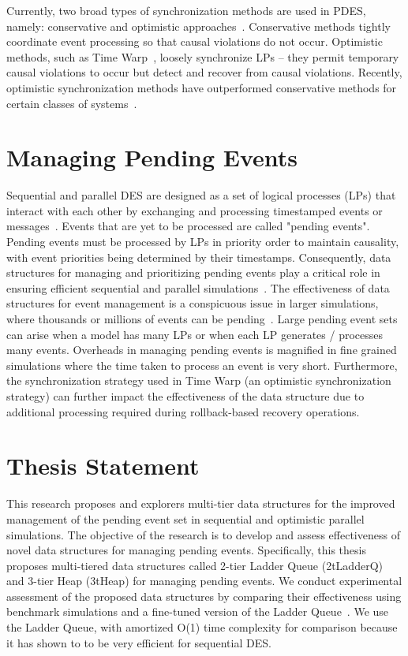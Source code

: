 Currently, two broad types of synchronization methods are used in
PDES, namely: conservative and optimistic approaches~\cite{jafer-13}.
Conservative methods tightly coordinate event processing so that
causal violations do not occur.  Optimistic methods, such as Time
Warp~\cite{jafer-13}, loosely synchronize LPs -- they permit temporary
causal violations to occur but detect and recover from causal
violations.  Recently, optimistic synchronization methods have outperformed conservative methods for certain classes of
systems~\cite{jafer-13}.


\section{Managing Pending Events}

Sequential and parallel DES are designed as a set of logical processes
(LPs) that interact with each other by exchanging and processing
timestamped events or messages~\cite{jafer-13}. Events that are yet to
be processed are called "pending events". Pending events must be
processed by LPs in priority order to maintain causality, with event
priorities being determined by their timestamps. Consequently, data
structures for managing and prioritizing pending events play a
critical role in ensuring efficient sequential and parallel
simulations~\cite{jones-86,ronngren-97,brown-88,franceschini-15}. The
effectiveness of data structures for event management is a conspicuous
issue in larger simulations, where thousands or millions of events can
be pending~\cite{carothers-2010,yeom-14}. Large pending event sets can
arise when a model has many LPs or when each LP generates / processes
many events. Overheads in managing pending events is magnified in fine
grained simulations where the time taken to process an event is very
short. Furthermore, the synchronization strategy used in Time Warp (an
optimistic synchronization strategy) can further impact the
effectiveness of the data structure due to additional processing
required during rollback-based recovery operations.

\section{Thesis Statement}

This research proposes and explorers multi-tier data structures for
the improved management of the pending event set in sequential and
optimistic parallel simulations.  The objective of the research is to
develop and assess effectiveness of novel data structures for managing
pending events.  Specifically, this thesis proposes multi-tiered data
structures called 2-tier Ladder Queue (2tLadderQ) and 3-tier Heap
(3tHeap) for managing pending events.  We conduct experimental assessment of the
proposed data structures by comparing their
effectiveness using benchmark simulations and a fine-tuned version of
the Ladder Queue~\cite{tang-05}. We use the Ladder Queue, with amortized
O(1) time complexity for comparison because it has
shown to to be very efficient for sequential DES. \newline

